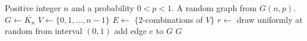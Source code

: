 
\begin{algorithmic}[1]
\Require Positive integer $n$ and a probability $0 < p < 1$.
\Ensure A random graph from $G(n,p)$.
\State $G \gets \overline{K_n}$
\State $V \gets \{0, 1, \dots, n - 1\}$
\State $E \gets$ $\{2$-combinations of $V\}$
  \State $r \gets$ draw uniformly at random from interval $(0,1)$
    \State add edge $e$ to $G$
  \EndIf
\EndFor
\State \Return $G$
\end{algorithmic}
